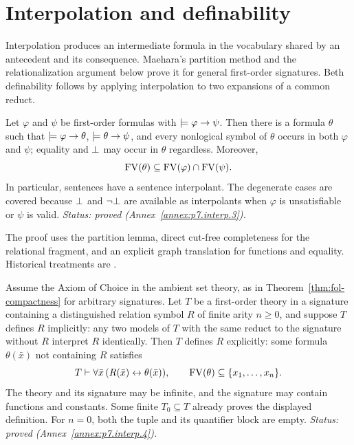 \section{Interpolation and definability}
\label{sec:cut-elimination-interpolation}

Interpolation produces an intermediate formula in the vocabulary shared by
an antecedent and its consequence.  Maehara's partition method and the
relationalization argument below prove it for general first-order signatures.
Beth definability follows by applying interpolation to two expansions of a
common reduct.

\begin{theorem}
\label{thm:craig-interpolation}
Let \(\varphi\) and \(\psi\) be first-order formulas with
\(\models\varphi\to\psi\).  Then there is a formula \(\theta\) such
that \(\models\varphi\to\theta\), \(\models\theta\to\psi\), and
every nonlogical symbol of \(\theta\) occurs in both \(\varphi\) and
\(\psi\); equality and \(\bot\) may occur in \(\theta\)
regardless.  Moreover,
\[
 \operatorname{FV}(\theta)\subseteq\operatorname{FV}(\varphi)\cap\operatorname{FV}(\psi).
\]
In particular, sentences have a sentence interpolant.
The degenerate cases are covered because \(\bot\) and
\(\neg\bot\) are available as interpolants when \(\varphi\) is
unsatisfiable or \(\psi\) is valid.
\textit{Status: proved (Annex~\ref{annex:p7.interp.3}).}
\end{theorem}

The proof uses the partition lemma, direct cut-free completeness for the
relational fragment, and an explicit graph translation for functions and
equality.  Historical treatments are
\cite{Craig1957,Maehara1960,TroelstraSchwichtenberg2000,Hodges1993}.

\begin{theorem}
\label{thm:beth}
Assume the Axiom of Choice in the ambient set theory, as in
Theorem~\ref{thm:fol-compactness} for arbitrary signatures.
Let \(T\) be a first-order theory in a signature containing a
distinguished relation symbol \(R\) of finite arity \(n\geq0\), and suppose \(T\) defines \(R\)
implicitly: any two models of \(T\) with the same reduct to the signature
without \(R\) interpret \(R\) identically.  Then \(T\) defines \(R\)
explicitly: some formula \(\theta(\bar x)\) not containing \(R\)
satisfies
\[
 T\vdash\forall\bar x\,
       (R(\bar x)\leftrightarrow\theta(\bar x)),
 \qquad \operatorname{FV}(\theta)\subseteq\{x_1,\ldots,x_n\}.
\]
The theory and its signature may be infinite, and the signature may contain
functions and constants.  Some finite \(T_0\subseteq T\) already proves
the displayed definition.  For \(n=0\), both the tuple and its quantifier
block are empty.
\textit{Status: proved (Annex~\ref{annex:p7.interp.4}).}
\end{theorem}

